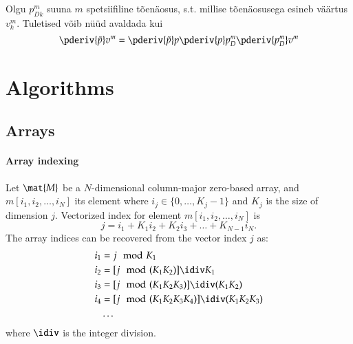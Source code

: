 \documentclass[a4paper]{article}
\numberwithin{equation}{subsection}
\begin{document}
Olgu $p_{Dk}^m$ suuna $m$ spetsiifiline tõenäosus, s.t. millise
tõenäosusega esineb väärtus $v_k^m$.  Tuletised võib nüüd avaldada kui
\begin{equation}
  \pderiv{\tilde{p}} v^m = 
  \pderiv{\tilde{p}} p
  \pderiv{p} p_D^m
  \pderiv{p_D^m} v^m
\end{equation}



\clearpage
{}
\section{Algorithms}
\label{sec:algorithms}

\subsection{Arrays}



\paragraph{Array indexing}

Let $\mat{M}$ be a $N$-dimensional column-major zero-based array, and $m[i_1, i_2, \dots,i_N]$
its element where $i_j \in \{0,\dots,K_j-1\}$ and $K_j$ is the size of
dimension $j$.  Vectorized index for element $m[i_1, i_2, \dots,i_N]$ is
\begin{equation}
  j = i_1 + K_1 i_2  + K_2 i_3 + \dots + K_{N-1} i_N.
\end{equation}
The array indices can be recovered from the vector index $j$ as: 
\begin{align*}
  i_1 &= j \mod K_1\\
  i_2 &= [j \mod (K_1 K_{2})] \idiv K_1\\
  i_3 &= [j \mod (K_1 K_2 K_{3})] \idiv (K_1 K_{2})\\
  i_4 &= [j \mod (K_1 K_2 K_3 K_{4})] \idiv (K_{1} K_{2} K_{3})\\
      & \dots
\end{align*}
where $\idiv$ is the integer division.



\newpage


\end{document}
